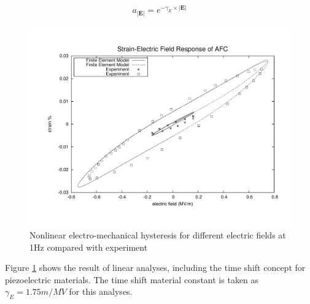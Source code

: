 \begin{equation}
a_{ |\textbf {E}| }=e^{-\gamma_{E} \times |\textbf {E}|}
\label{equation:time_scaling_factor}	
\end{equation}

\begin{figure} 
\centering
\includegraphics[trim = 0mm 0mm 0mm 0mm,width=5.0in]
{./chap_4_structural_analyses/afc_unit_cell/linear_hysteris_time_shift_afc/time_shift_afc_electric_field_vs_strains.pdf}
\caption{Nonlinear electro-mechanical hysteresis for different electric fields at 1Hz compared with experiment}
\label{fig:time_shift_afc_electric_field_vs_strains}
\end{figure}

Figure \ref{fig:time_shift_afc_electric_field_vs_strains} shows the result of linear analyses, including the time shift concept for piezoelectric materials.
The time shift material constant is taken as $\gamma_{E}=1.75 m/MV$ for this analyses.
\clearpage